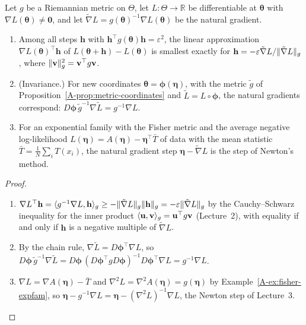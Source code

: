 \begin{proposition}\label{A-prop:natural-gradient}
    Let $g$ be a Riemannian metric on $\Theta$, let $L: \Theta \to \mathbb{R}$ be differentiable at $\boldsymbol{\theta}$ with $\nabla L(\boldsymbol{\theta}) \neq \mathbf{0}$, and let $\tilde\nabla L = g(\boldsymbol{\theta})^{-1}\nabla L(\boldsymbol{\theta})$ be the natural gradient.
    \begin{enumerate}
        \item Among all steps $\mathbf{h}$ with $\mathbf{h}^\top g(\boldsymbol{\theta})\mathbf{h} = \varepsilon^2$, the linear approximation $\nabla L(\boldsymbol{\theta})^\top\mathbf{h}$ of $L(\boldsymbol{\theta} + \mathbf{h}) - L(\boldsymbol{\theta})$ is smallest exactly for $\mathbf{h} = -\varepsilon\tilde\nabla L/\lVert \tilde\nabla L \rVert_g$, where $\lVert \mathbf{v} \rVert_g^2 = \mathbf{v}^\top g\mathbf{v}$.
        \item (Invariance.) For new coordinates $\boldsymbol{\theta} = \boldsymbol{\phi}(\boldsymbol{\eta})$, with the metric $\tilde g$ of Proposition~\ref{A-prop:metric-coordinates} and $\tilde L = L \circ \boldsymbol{\phi}$, the natural gradients correspond: $D\boldsymbol{\phi}\,\tilde g^{-1}\nabla\tilde L = g^{-1}\nabla L$.
        \item For an exponential family with the Fisher metric and the average negative log-likelihood $L(\boldsymbol{\eta}) = A(\boldsymbol{\eta}) - \boldsymbol{\eta}^\top\bar T$ of data with the mean statistic $\bar T = \frac{1}{N}\sum_i T(x_i)$, the natural gradient step $\boldsymbol{\eta} - \tilde\nabla L$ is the step of Newton's method.
    \end{enumerate}
\end{proposition}

\begin{proof}
    \begin{enumerate}
        \item $\nabla L^\top\mathbf{h} = \langle g^{-1}\nabla L, \mathbf{h} \rangle_g \geq -\lVert \tilde\nabla L \rVert_g\lVert \mathbf{h} \rVert_g = -\varepsilon\lVert \tilde\nabla L \rVert_g$ by the Cauchy--Schwarz inequality for the inner product $\langle \mathbf{u}, \mathbf{v} \rangle_g = \mathbf{u}^\top g\mathbf{v}$ (Lecture~2), with equality if and only if $\mathbf{h}$ is a negative multiple of $\tilde\nabla L$.
        \item By the chain rule, $\nabla\tilde L = D\boldsymbol{\phi}^\top\nabla L$, so $D\boldsymbol{\phi}\,\tilde g^{-1}\nabla\tilde L = D\boldsymbol{\phi}\,(D\boldsymbol{\phi}^\top gD\boldsymbol{\phi})^{-1}D\boldsymbol{\phi}^\top\nabla L = g^{-1}\nabla L$.
        \item $\nabla L = \nabla A(\boldsymbol{\eta}) - \bar T$ and $\nabla^2L = \nabla^2A(\boldsymbol{\eta}) = g(\boldsymbol{\eta})$ by Example~\ref{A-ex:fisher-expfam}, so $\boldsymbol{\eta} - g^{-1}\nabla L = \boldsymbol{\eta} - (\nabla^2L)^{-1}\nabla L$, the Newton step of Lecture~3. \qedhere
    \end{enumerate}
\end{proof}

